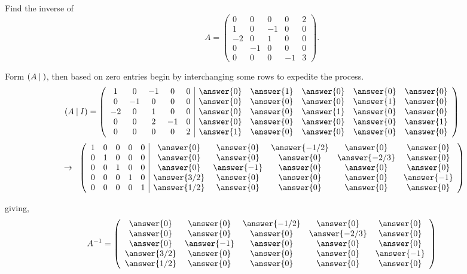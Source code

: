 \documentclass{ximera}
\begin{document}
\begin{exercise}

Find the inverse of
\[A = \left(\begin{array}{ccccc}
0 & 0& 0& 0& 2\\
1 & 0& -1& 0& 0\\
-2 & 0& 1& 0& 0\\
0 & -1& 0& 0& 0\\
0 & 0& 0& -1& 3
\end{array}\right).
\]

\begin{prompt}
Form $(A \hspace{.08cm}| \hspace{.08cm})$, then based on zero entries begin by interchanging some rows to expedite the process.
\[ (A \hspace{.08cm}| \hspace{.08cm} I)=
\left(\begin{array}{ccccc|ccccc}
1 & 0& -1& 0& 0 & \answer{0} & \answer{1} & \answer{0} & \answer{0} & \answer{0}\\
0 & -1& 0& 0& 0 & \answer{0} & \answer{0} & \answer{0} & \answer{1} & \answer{0}\\
-2 & 0& 1& 0& 0 & \answer{0} & \answer{0} & \answer{1} & \answer{0} & \answer{0}\\
0 & 0& 2& -1& 0 & \answer{0} & \answer{0} & \answer{0} & \answer{0} & \answer{1}\\
0 & 0& 0& 0& 2 & \answer{1} & \answer{0} & \answer{0} & \answer{0} & \answer{0}
\end{array}\right)
\]
\[
\hspace{.2cm} \rightarrow \hspace{.2cm}
\left(\begin{array}{ccccc|ccccc}
1 & 0& 0& 0& 0 & \answer{0} & \answer{0} & \answer{-1/2} & \answer{0} & \answer{0}\\
0 & 1& 0& 0& 0 & \answer{0} & \answer{0} & \answer{0} & \answer{-2/3} & \answer{0}\\
0 & 0& 1& 0& 0 & \answer{0} & \answer{-1} & \answer{0} & \answer{0} & \answer{0}\\
0 & 0& 0& 1& 0 & \answer{3/2} & \answer{0} & \answer{0} & \answer{0} & \answer{-1}\\
0 & 0& 0& 0& 1 & \answer{1/2} & \answer{0} & \answer{0} & \answer{0} & \answer{0}
\end{array}\right)
\]

giving,
\[
A^{-1} = \left(\begin{array}{ccccc}
\answer{0} & \answer{0} & \answer{-1/2} & \answer{0} & \answer{0}\\
 \answer{0} & \answer{0} & \answer{0} & \answer{-2/3} & \answer{0}\\
 \answer{0} & \answer{-1} & \answer{0} & \answer{0} & \answer{0}\\
 \answer{3/2} & \answer{0} & \answer{0} & \answer{0} & \answer{-1}\\
 \answer{1/2} & \answer{0} & \answer{0} & \answer{0} & \answer{0}
\end{array}\right)
\]

\end{prompt}
\end{exercise}
\end{document}
